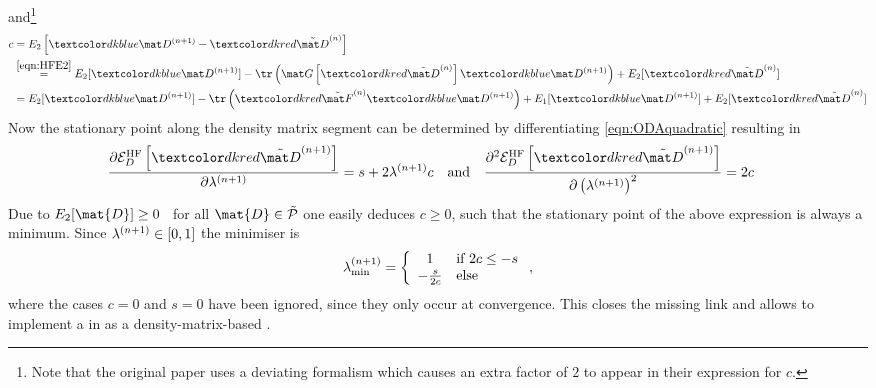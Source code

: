 and\footnote{Note that the original paper \cite{Cances2000a} uses a deviating formalism %
which causes an extra factor of $2$ to appear in their expression for $c$.}
\begin{equation}
\begin{aligned}
	c &= E_2\left[ \Pe{n+1} - \Pet{n} \right] \\
	&\stackrel{\eqref{eqn:HFE2}}{=}
		E_2 [\Pe{n+1}] - \tr\left( \Gfct{\Pet{n}} \Pe{n+1} \right) + E_2 [\Pet{n}] \\
	&= E_2 [\Pe{n+1}] - \tr \left( \Fot{n} \Pe{n+1} \right) + E_1[\Pe{n+1}] + E_2 [\Pet{n}]
\end{aligned}
\label{eqn:ODAc}
\end{equation}
Now the stationary point along the density matrix segment
can be determined by differentiating \eqref{eqn:ODAquadratic} resulting in
\begin{align*}
	\frac{\partial \EHFD{\Pet{n+1}}}{\partial \la{n+1}}
	&= s + 2 \la{n+1} c
	&&\text{and}&
	\frac{\partial^2 \EHFD{\Pet{n+1}}}{\partial \left(\la{n+1}\right)^2} &= 2c
\end{align*}
Due to $E_2[\mat{D}] \geq 0$~\cite{Cances2000a} for all $\mat{D} \in \tilde{\mathcal{P}}$
one easily deduces $c \geq 0$,
such that the stationary point of the above expression is always a minimum.
Since $\lambda^{(n+1)} \in [0,1]$ the minimiser is
\begin{equation}
	\label{eqn:ODALambdaOpt}
	\lambda^{(n+1)}_\text{min} = \left\{
	\begin{array}{cl}
		1 & \text{if $2c \leq -s$} \\
		- \frac{s}{2c} & \text{else}
	\end{array}
	\right.,
\end{equation}
where the cases $c=0$ and $s=0$ have been ignored, since they only occur at convergence.
This closes the missing link and allows to implement a \ODA
in as a density-matrix-based \SCF.

